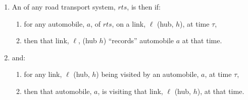 {\begin{enumerate}\setei     
\item \label{nasa-00740a-b} An  of any road
                         transport system, $rts$, is then if: 
\begin{enumerate}  
\item \label{nasa-00740a} for {any} automobile, $a$, of $rts$, \nyl on a link, $\ell$ (hub,
                         $h$), \nyl at time $\tau$,
\item \label{nasa-00740b} then that link, $\ell$, (hub $h$) \nyl ``records'' automobile $a$ \nyl at that time.
\saveii\end{enumerate} 
\item \label{nasa-00740c-d} {and:}
\begin{enumerate}\seteii 
\item \label{nasa-00740c} for  {any} link, $\ell$ (hub, $h$) \nyl being visited by an
                         automobile, $a$, \nyl at time $\tau$,
\item \label{nasa-00740d} then that automobile, $a$, \nyl is visiting that link, $\ell$
                        (hub, $h$), \nyl at that time.  
\end{enumerate} 
\savei\end{enumerate}

}
